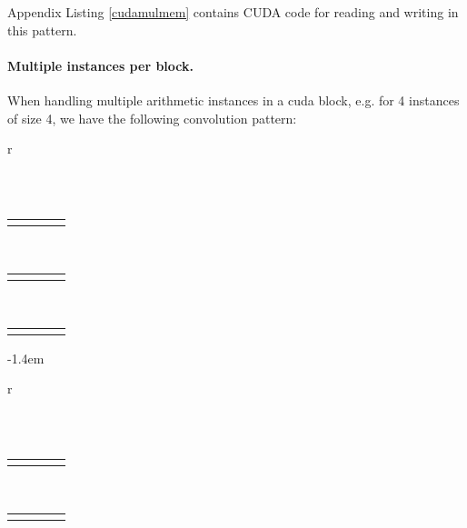 Appendix Listing \ref{cudamulmem} contains CUDA code for reading and
writing in this pattern.

\paragraph{Multiple instances per block.}
When handling multiple arithmetic instances in a cuda block, e.g. for 4
instances of size 4, we have the following convolution pattern:
\begin{center}
  \begin{tabular}{r}
    \begin{tabular}{|C{0.1cm}|C{0.1cm}|C{0.1cm}|C{0.1cm}|}
      \hline
       \cgray & \cgray &\cgray  &\cgray \\
      \hline
    \end{tabular}\\[0.1ex]
    \begin{tabular}{C{0.1cm}|C{0.1cm}|C{0.1cm}|C{0.1cm}|}
       & \cgray & \cgray & \cgray\\
    \end{tabular}\\[0.1ex]
    \begin{tabular}{C{0.1cm}C{0.1cm}|C{0.1cm}|C{0.1cm}|}
       &  & \cgray & \cgray\\
    \end{tabular}\\[0.1ex]
    \begin{tabular}{C{0.1cm}C{0.1cm}C{0.1cm}|C{0.1cm}|}
       &  &  & \cgray \\
    \end{tabular}
  \end{tabular}
  \kern-1.4em
  \begin{tabular}{r}
    \begin{tabular}{C{0.1cm}|C{0.1cm}|C{0.1cm}|C{0.1cm}|}
      \hline
      \cbeige &\cbeige  &\cbeige  &\cbeige \\
      \hline
    \end{tabular}\\[0.1ex]
    \begin{tabular}{C{0.1cm}|C{0.1cm}|C{0.1cm}|C{0.1cm}|}
       & \cbeige & \cbeige & \cbeige\\
    \end{tabular}\\[0.1ex]
    \begin{tabular}{C{0.1cm}C{0.1cm}|C{0.1cm}|C{0.1cm}|}
       &  & \cbeige &\cbeige \\

\end{tabular}
\end{tabular}
\end{center}
